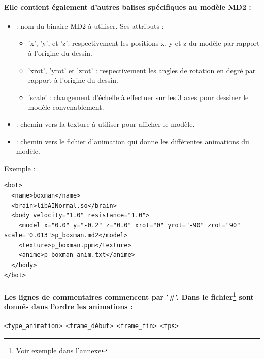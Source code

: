 \paragraph{Elle contient également d'autres balises spécifiques au modèle MD2 :}
\begin{itemize}
	\item[\verb?<model>?] : nom du binaire MD2 à utiliser. Ses attributs :
	\begin{itemize}
		\item 'x', 'y', et 'z':  respectivement les positions x, y et z du modèle par rapport à l'origine du dessin.
		\item 'xrot', 'yrot' et 'zrot' : respectivement les angles de rotation en degré par rapport à l'origine du dessin.
		\item 'scale' : changement d'échelle à effectuer sur les 3 axes pour dessiner le modèle convenablement.
	\end{itemize}
	\item[\verb?<texture>?] : chemin vers la texture à utiliser pour afficher le modèle.
	\item[\verb?<anime>?] : chemin vers le fichier d'animation qui donne les différentes animations du modèle.
\end{itemize}

\vspace{1cm}

Exemple :
\begin{scriptsize}\begin{verbatim}
<bot>
  <name>boxman</name>
  <brain>libAINormal.so</brain>
  <body velocity="1.0" resistance="1.0">
    <model x="0.0" y="-0.2" z="0.0" xrot="0" yrot="-90" zrot="90" scale="0.013">p_boxman.md2</model>
    <texture>p_boxman.ppm</texture>
    <anime>p_boxman_anim.txt</anime>
  </body>
</bot>
\end{verbatim}\end{scriptsize}

\vspace{1cm}
	
\paragraph{Les lignes de commentaires commencent par '\#'. Dans le fichier\footnote{Voir exemple dans l'annexe} sont donnés dans l'ordre les animations :}


\begin{verbatim}
<type_animation> <frame_début> <frame_fin> <fps>
\end{verbatim}


